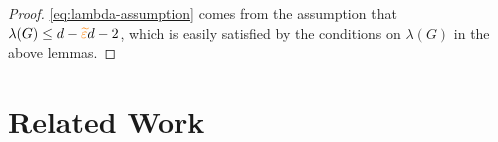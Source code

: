 \documentclass[11pt]{article}
\newcommand{\Subdivision}[2]{{#1}^{#2}}
\newcommand{\MinimalDegree}[1]{\delta(#1)}
\newcommand{\dbtilde}[1]{\tilde{\raisebox{0pt}[0.85\height]{$\tilde{#1}$}}}
\newcommand{\ExpansionFactor}[1]{\lambda(#1)}
\begin{document}
\begin{proof}
\eqref{eq:lambda-assumption} comes from the assumption that $\ExpansionFactor{G} \leq d - \PartitionEps d - 2$, which is easily satisfied by the conditions on $\ExpansionFactor{G}$ in the above lemmas.

\end{proof}

\section{Related Work}

\clearpage


\end{document}
